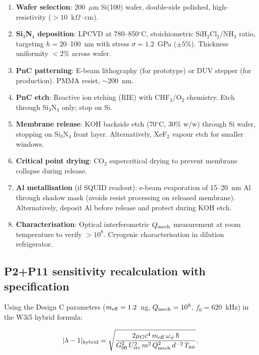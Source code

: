 \documentclass[11pt]{article}
\theoremstyle{definition}
\theoremstyle{remark}
\newcommand{\Opsi}{\omega_\psi}
\newcommand{\lam}{|\lambda-1|}
\newcommand{\muG}{\mu_G}
\newcommand{\Qmech}{Q_{\rm mech}}
\begin{document}
\begin{enumerate}
  \item \textbf{Wafer selection}: 200~$\mu$m Si(100) wafer, double-side
    polished, high-resistivity ($>10$~k$\Omega\cdot$cm).

  \item \textbf{Si$_3$N$_4$ deposition}: LPCVD at 780--850$^\circ$C,
    stoichiometric SiH$_2$Cl$_2$/NH$_3$ ratio, targeting $h = 20$--100~nm
    with stress $\sigma = 1.2$~GPa ($\pm 5\%$). Thickness uniformity
    $< 2\%$ across wafer.

  \item \textbf{PnC patterning}: E-beam lithography (for prototype) or
    DUV stepper (for production). PMMA resist, $\sim 200$~nm.

  \item \textbf{PnC etch}: Reactive ion etching (RIE) with CHF$_3$/O$_2$
    chemistry. Etch through Si$_3$N$_4$ only; stop on Si.

  \item \textbf{Membrane release}: KOH backside etch (70$^\circ$C,
    30\% w/w) through Si wafer, stopping on Si$_3$N$_4$ front layer.
    Alternatively, XeF$_2$ vapour etch for smaller windows.

  \item \textbf{Critical point drying}: CO$_2$ supercritical drying to
    prevent membrane collapse during release.

  \item \textbf{Al metallisation} (if SQUID readout): e-beam evaporation
    of 15--20~nm Al through shadow mask (avoids resist processing on
    released membrane). Alternatively, deposit Al before release and
    protect during KOH etch.

  \item \textbf{Characterisation}: Optical interferometric $\Qmech$
    measurement at room temperature to verify $>10^8$. Cryogenic
    characterisation in dilution refrigerator.
\end{enumerate}

\subsection{P2+P11 sensitivity recalculation with specification}
\label{sec:sensitivity_recalc}

Using the Design C parameters ($m_{\rm eff} = 1.2$~ng,
$\Qmech = 10^9$, $f_0 = 620$~kHz) in the W3i5 hybrid formula:

\begin{equation}
  \lam_{\rm hybrid} = \sqrt{
  \frac{2\muG c^4\,m_{\rm eff}\,\Opsi\,\hbar}
  {G_{00}^2\,U_{\rm src}^2\,m^2\,\Qmech^2\,d^{-2}\,T_{\rm int}}
  }.
\end{equation}
\end{document}
